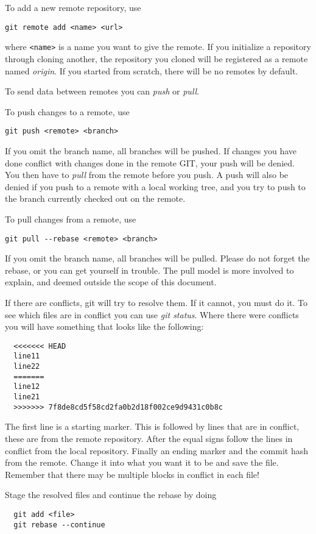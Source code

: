 To add a new remote repository, use
\begin{lstlisting}[style=shell]
  git remote add <name> <url>
\end{lstlisting}
where \texttt{<name>} is a name you want to give the remote. If you initialize a
repository through cloning another, the repository you cloned will be registered
as a remote named \emph{origin}. If you started from scratch, there will be no
remotes by default.

To send data between remotes you can \emph{push} or \emph{pull}.

To push changes to a remote, use
\begin{lstlisting}[style=shell]
  git push <remote> <branch>
\end{lstlisting}
If you omit the branch name, all branches will be pushed. If changes you have
done conflict with changes done in the remote GIT, your push will be denied. You
then have to \emph{pull} from the remote before you push. A push will also be
denied if you push to a remote with a local working tree, and you try to push to
the branch currently checked out on the remote.

To pull changes from a remote, use
\begin{lstlisting}[style=shell]
  git pull --rebase <remote> <branch>
\end{lstlisting}
If you omit the branch name, all branches will be pulled. Please do not forget
the rebase, or you can get yourself in trouble. The pull model is more involved
to explain, and deemed outside the scope of this document.

If there are conflicts, git will try to resolve them. If it cannot, you must do
it. To see which files are in conflict you can use \emph{git status}. Where
there were conflicts you will have something that looks like the following:
\begin{lstlisting}
  <<<<<<< HEAD
  line11
  line22
  =======
  line12
  line21
  >>>>>>> 7f8de8cd5f58cd2fa0b2d18f002ce9d9431c0b8c
\end{lstlisting}

The first line is a starting marker. This is followed by lines that are in
conflict, these are from the remote repository. After the equal signs follow the
lines in conflict from the local repository. Finally an ending marker and the
commit hash from the remote. Change it into what you want it to be and save the
file. Remember that there may be multiple blocks in conflict in each file!

Stage the resolved files and continue the rebase by doing
\begin{lstlisting}
  git add <file>
  git rebase --continue
\end{lstlisting}
